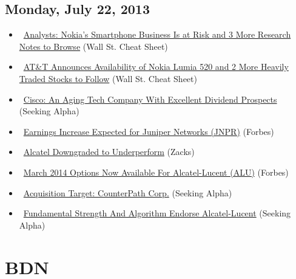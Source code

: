 \documentclass[11pt,asymmetric]{article}
\begin{document}
\subsection*{Monday, July 22, 2013}
\begin{itemize}
\item\ \href{http://wallstcheatsheet.com/stocks/analysts-nokias-smartphone-business-is-at-risk-and-3-more-research-notes-to-browse.html/?ref=YF}{Analysts: Nokia’s Smartphone Business Is at Risk and 3 More Research Notes to Browse} (Wall St. Cheat Sheet)
\item\ \href{http://wallstcheatsheet.com/stocks/att-announces-availability-of-nokia-lumia-520-and-2-more-heavily-traded-stocks-to-follow.html/?ref=YF}{AT\&T Announces Availability of Nokia Lumia 520 and 2 More Heavily Traded Stocks to Follow} (Wall St. Cheat Sheet)
\item\ \href{http://seekingalpha.com/article/1561992-cisco-an-aging-tech-company-with-excellent-dividend-prospects?source=yahoo}{Cisco: An Aging Tech Company With Excellent Dividend Prospects} (Seeking Alpha)
\item\ \href{http://www.forbes.com/sites/narrativescience/2013/07/22/earnings-increase-expected-for-juniper-networks-jnpr/?partner=yahootix}{Earnings Increase Expected for Juniper Networks (JNPR)} (Forbes)
\item\ \href{http://finance.yahoo.com/news/alcatel-downgraded-underperform-153002417.html}{Alcatel Downgraded to Underperform} (Zacks)
\item\ \href{http://www.forbes.com/sites/stockoptionschannel/2013/07/22/march-2014-options-now-available-for-alcatel-lucent-alu/?partner=yahootix}{March 2014 Options Now Available For Alcatel-Lucent (ALU)} (Forbes)
\item\ \href{http://seekingalpha.com/article/1561272-acquisition-target-counterpath-corp?source=yahoo}{Acquisition Target: CounterPath Corp.} (Seeking Alpha)
\item\ \href{http://seekingalpha.com/article/1561202-fundamental-strength-and-algorithm-endorse-alcatel-lucent?source=yahoo}{Fundamental Strength And Algorithm Endorse Alcatel-Lucent} (Seeking Alpha)
\end{itemize}

\section*{BDN}
\end{document}
